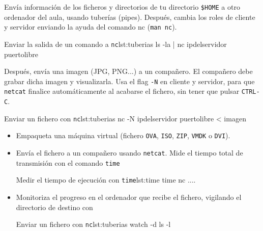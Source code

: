 \begin{homeworkProblem}
   Envía información de los ficheros y directorios de tu directorio \texttt{\$HOME} a otro ordenador del aula, usando tuberías (pipes). Después, cambia los roles de cliente y servidor enviando la ayuda del comando nc (\texttt{man nc}).



  \begin{listadoshell}{Enviar la salida de un comando a \texttt{nc}}{lst:tuberias}
    ls -la | nc ipdelservidor puertolibre
  \end{listadoshell}

  Después, envía una imagen (JPG, PNG...) a un compañero. El compañero debe grabar dicha imagen y visualizarla. Usa el flag \texttt{-N} en cliente y servidor, para que \texttt{netcat} finalice automáticamente al acabarse el fichero, sin tener que pulsar \texttt{CTRL-C}.

  \begin{listadoshell}{Enviar un fichero con \texttt{nc}}{lst:tuberias}
    nc -N ipdelservidor puertolibre < imagen
  \end{listadoshell}
\end{homeworkProblem}


\begin{homeworkProblem}
  \begin{itemize}
  \item Empaqueta una máquina virtual (fichero \texttt{OVA}, \texttt{ISO}, \texttt{ZIP}, \texttt{VMDK} o \texttt{DVI}).
  \item Envía el fichero a un compañero usando \texttt{netcat}. Mide el tiempo total de transmisión con el comando \texttt{time}

    \begin{listadoshell}{Medir el tiempo de ejecución con  \texttt{time}}{lst:time}
      time nc ....
    \end{listadoshell}
    
  \item Monitoriza el progreso en el ordenador que recibe el fichero, vigilando el directorio de destino con

    \begin{listadoshell}{Enviar un fichero con \texttt{nc}}{lst:tuberias}
      watch -d ls -l
    \end{listadoshell}

    
  \end{itemize}
\end{homeworkProblem}

